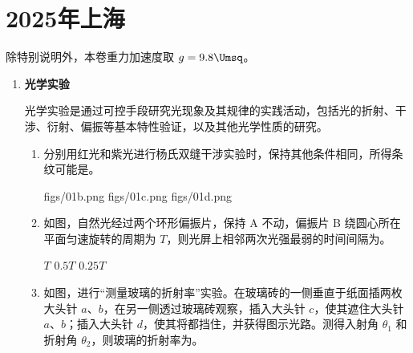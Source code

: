 \documentclass[\gkver]{gaokaozhenti}
\begin{document}
\chapter{2025年上海}

除特别说明外，本卷重力加速度取 $g = 9.8\Umsq$。

\begin{enumerate}
\item
\textbf{光学实验}

光学实验是通过可控手段研究光现象及其规律的实践活动，包括光的折射、干涉、衍射、偏振等基本特性验证，以及其他光学性质的研究。
\begin{enumerate}
	\item
	分别用红光和紫光进行杨氏双缝干涉实验时，保持其他条件相同，所得条纹可能是。

	{figs/01b.png}
	{figs/01c.png}
	{figs/01d.png}

	\item
	如图，自然光经过两个环形偏振片，保持 A 不动，偏振片 B 绕圆心所在平面匀速旋转的周期为 $T$，则光屏上相邻两次光强最弱的时间间隔为。

	\onepicture[h=2.6cm, align=right]{}

	{$T$}
	{$0.5T$}
	{$0.25T$}

	\item
	如图，进行“测量玻璃的折射率”实验。在玻璃砖的一侧垂直于纸面插两枚大头针 $a$、$b$，在另一侧透过玻璃砖观察，插入大头针 $c$，使其遮住大头针 $a$、$b$；插入大头针 $d$，使其将都挡住，并获得图示光路。测得入射角 $\theta_{1}$ 和折射角 $\theta_{2}$，则玻璃的折射率为。

	\onepicture[h=3.0cm, align=right]{}
\end{enumerate}
\end{enumerate}
\end{document}
